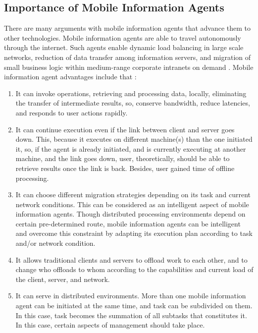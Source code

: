 \documentclass[12pt,a4paper,final,twoside,onecolumn,titlepage]{book}
\begin{document}
\subsection{Importance of Mobile Information Agents}
There are many arguments with mobile information agents that advance them to other technologies.  Mobile information agents are able to travel autonomously through the internet. Such agents enable dynamic load balancing in large scale networks, reduction of data transfer among information servers, and migration of small business logic within medium-range corporate intranets on demand \cite{BS37}. Mobile information agent advantages include that \cite{MNAS02}:
\begin{enumerate}
\item It can invoke operations, retrieving and processing data, locally, eliminating the transfer of intermediate results, so, conserve bandwidth, reduce latencies, and responds to user actions rapidly.
\item It can continue execution even if the link between client and server goes down. This, because it executes on different machine(s) than the one initiated it, so, if the agent is already initiated, and is currently executing at another machine, and the link goes down, user, theoretically, should be able to retrieve results once the link is back. Besides, user gained time of offline processing.
\item It can choose different migration strategies depending on its task and current network conditions. This can be considered as an intelligent aspect of mobile information agents. Though distributed processing environments depend on certain pre-determined route, mobile information agents can be intelligent and overcome this constraint by adapting its execution plan according to task and/or network condition.
\item It allows traditional clients and servers to offload work to each other, and to change who offloads to whom according to the capabilities and current load of the client, server, and network.
\item It can serve in distributed environments. More than one mobile information agent can be initiated at the same time, and task can be subdivided on them. In this case, task becomes the summation of all subtasks that constitutes it. In this case, certain aspects of management should take place.
\end{enumerate}
\end{document}
